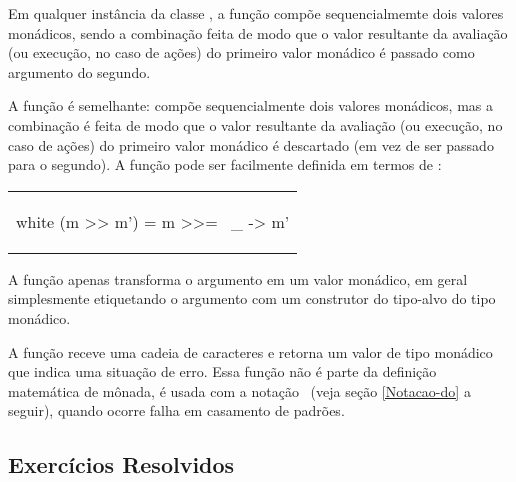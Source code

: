 Em qualquer instância da classe , a função \ina{(>>=)}
compõe sequencialmemte dois valores monádicos, sendo a combinação
feita de modo que o valor resultante da avaliação (ou execução, no
caso de ações) do primeiro valor monádico é passado como argumento do
segundo.

A função \ina{(>>)} é semelhante: compõe sequencialmente dois valores
monádicos, mas a combinação é feita de modo que o valor resultante da
avaliação (ou execução, no caso de ações) do primeiro valor monádico é
descartado (em vez de ser passado para o segundo). A função \ina{(>>)}
pode ser facilmente definida em termos de \ina{(>>=)}:

\begin{center}
\begin{tabular}{l}
\begin{alg}{.5\textwidth}{white}
(m >> m') = m >>= \ _ -> m'
\end{alg}
\end{tabular}
\end{center}

A função  apenas transforma o argumento em um valor
monádico, em geral simplesmente etiquetando o argumento com um
construtor do tipo-alvo do tipo monádico.

A função  receve uma cadeia de caracteres e retorna um valor
de tipo monádico que indica uma situação de erro. Essa função não é
parte da definição matemática de mônada, é usada com a notação
\ddo\ (veja seção \ref{Notacao-do} a seguir), quando ocorre falha em
casamento de padrões.

\subsection{Exercícios Resolvidos}


